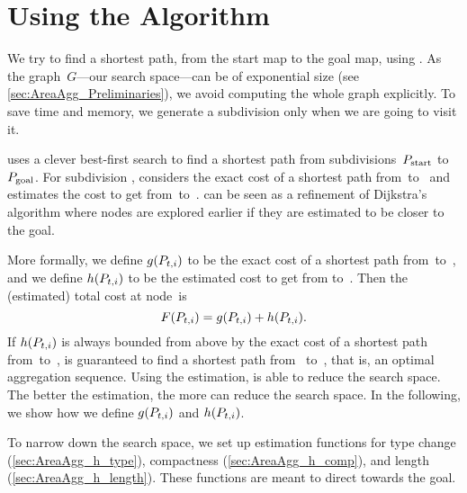 \section{Using the \Astar Algorithm}
\label{sec:AreaAgg_AStar}




We try to find a shortest path,
from the start map to the goal map,
using \Astar \citep{Hart1968}.  
As the graph~$G$---our search space---can be of exponential size 
(see \sect\ref{sec:AreaAgg_Preliminaries}), 
we avoid computing the whole graph explicitly.
To save time and memory, 
we generate a subdivision \Pnode only 
when we are going to visit it.

\Astar uses a clever best-first search 
to find a shortest path 
from subdivisions~$P_\mathrm{start}$ to~$P_\mathrm{goal}$.  
For subdivision \Pnode,
\Astar considers the exact cost of a shortest path 
from~\Pstart to~\Pnode 
and estimates the cost to get from~\Pnode to~\Pgoal.  
\Astar can be seen as a refinement of Dijkstra's algorithm
where nodes are explored earlier 
if they are estimated to be closer to the goal.

More formally, we define $g(P_{t,i})$ to be 
the exact cost of a shortest path from~\Pstart to~\Pnode, 
and we define $h(P_{t,i})$ to be the estimated cost 
to get from \Pnode to~\Pgoal. 
Then the (estimated) total cost at node~\Pnode is
\begin{equation}
\label{eq:CostTotal}
F(P_{t,i})=g(P_{t,i})+h(P_{t,i}).
\end{equation}
If $h(P_{t,i})$ is always bounded from above 
by the exact cost of a shortest path from~\Pnode to~\Pgoal, 
\Astar is guaranteed to find a shortest path from~\Pstart 
to~\Pgoal, 
that is, an optimal aggregation sequence.  
Using the estimation, \Astar is able to reduce the search space.
The better the estimation, the more \Astar can reduce the search 
space.
In the following, we show how we define $g(P_{t,i})$ and 
$h(P_{t,i})$.

To narrow down the search space, 
we set up estimation functions 
for type change (\sect\ref{sec:AreaAgg_h_type}), 
compactness (\sect\ref{sec:AreaAgg_h_comp}), 
and length (\sect\ref{sec:AreaAgg_h_length}). 
These functions are meant to direct \Astar towards the goal.

